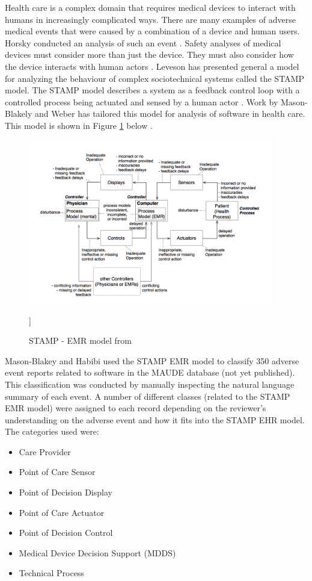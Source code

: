 \documentclass[11pt, notitlepage,abstracton,oneside]{article}   	%
\begin{document}
Health care is a complex domain that requires medical devices to interact with humans in increasingly complicated ways. There are many examples of adverse medical events that were caused by a combination of a device and human users. Horsky conducted an analysis of such an event \cite{horsky_2005}. Safety analyses of medical devices must consider more than just the device. They must also consider how the device interacts with human actors \cite{karsh_health_2010}. Leveson has presented general a model for analyzing the behaviour of complex sociotechnical systems called the STAMP model. The STAMP model describes a system as a feedback control loop with a controlled process being actuated and sensed by a human actor \cite{leveson_engineering_2012}. Work by Mason-Blakely and Weber has tailored this model for analysis of software in health care. This model is shown in Figure \ref{fig:stamp-emr} below \cite{stamp_emr_2011}.

\begin{figure}[ht]
	\centering
	\includegraphics[width=0.95\textwidth]{figures/stamp-emr}
	\caption{STAMP - EMR model from \cite{stamp_emr_2011}}
	]\label{fig:stamp-emr}
\end{figure}

Mason-Blakey and Habibi used the STAMP EMR model to classify 350 adverse event reports related to software in the MAUDE database (not yet published). This classification was conducted by manually inspecting the natural language summary of each event. A number of different classes (related to the STAMP EMR model) were assigned to each record depending on the reviewer's understanding on the adverse event and how it fits into the STAMP EHR model. The categories used were: 

\begin{itemize}
	\item Care Provider
	\item Point of Care Sensor
	\item Point of Decision Display
	\item Point of Care Actuator
	\item Point of Decision Control
	\item Medical Device Decision Support (MDDS)
	\item Technical Process
\end{itemize}
\end{document}
